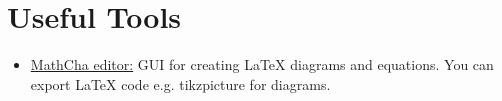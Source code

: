 \section{Useful Tools}\label{sec:usefulTools}
\begin{itemize}
	\item \href{https://www.mathcha.io/}{MathCha editor:} GUI for creating LaTeX diagrams and equations. You can export LaTeX code e.g. tikzpicture for diagrams.
\end{itemize}